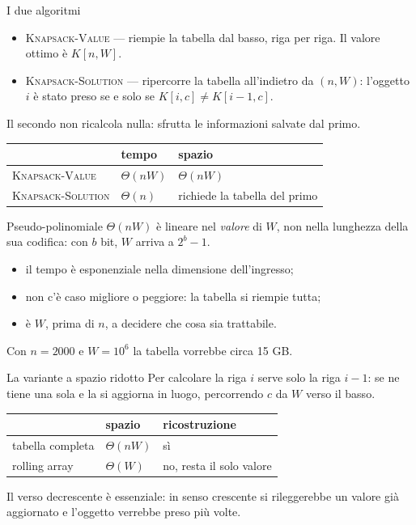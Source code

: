 \documentclass[aspectratio=169,11pt]{beamer}
\newcommand{\To}{\Theta}
\begin{document}
\begin{frame}{I due algoritmi}
  \begin{itemize}
    \item \textsc{Knapsack-Value} --- riempie la tabella dal basso, riga per riga.
          Il valore ottimo \`e $K[n,W]$.
    \item \textsc{Knapsack-Solution} --- ripercorre la tabella all'indietro da
          $(n,W)$: l'oggetto $i$ \`e stato preso se e solo se
          $K[i,c] \neq K[i-1,c]$.
  \end{itemize}
  \vfill
  Il secondo non ricalcola nulla: sfrutta le informazioni salvate dal primo.
  \vfill
  \begin{center}
  \begin{tabular}{lll}
    \toprule
     & tempo & spazio \\
    \midrule
    \textsc{Knapsack-Value}    & $\To(nW)$ & $\To(nW)$ \\
    \textsc{Knapsack-Solution} & $\To(n)$  & richiede la tabella del primo \\
    \bottomrule
  \end{tabular}
  \end{center}
\end{frame}

\begin{frame}{Pseudo-polinomiale}
  $\To(nW)$ \`e lineare nel \emph{valore} di $W$, non nella lunghezza della sua
  codifica: con $b$ bit, $W$ arriva a $2^b-1$.
  \vfill
  \begin{itemize}
    \item il tempo \`e esponenziale nella dimensione dell'ingresso;
    \item non c'\`e caso migliore o peggiore: la tabella si riempie tutta;
    \item \`e $W$, prima di $n$, a decidere che cosa sia trattabile.
  \end{itemize}
  \vfill
  {\small Con $n = 2000$ e $W = 10^6$ la tabella vorrebbe circa 15 GB.}
\end{frame}

\begin{frame}{La variante a spazio ridotto}
  Per calcolare la riga $i$ serve solo la riga $i-1$: se ne tiene una sola e la
  si aggiorna in luogo, percorrendo $c$ da $W$ verso il basso.
  \vfill
  \begin{center}
  \begin{tabular}{lll}
    \toprule
     & spazio & ricostruzione \\
    \midrule
    tabella completa & $\To(nW)$ & s\`i \\
    rolling array    & $\To(W)$  & no, resta il solo valore \\
    \bottomrule
  \end{tabular}
  \end{center}
  \vfill
  Il verso decrescente \`e essenziale: in senso crescente si rileggerebbe un
  valore gi\`a aggiornato e l'oggetto verrebbe preso pi\`u volte.
\end{frame}
\end{document}

